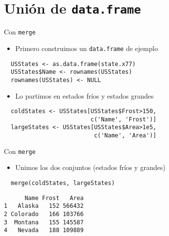 \documentclass[xcolor={usenames,svgnames,dvipsnames}]{beamer}
\begin{document}
\section{Unión de \texttt{data.frame}}
\label{sec-5}
\begin{frame}[fragile,label=sec-5-1]{Con \texttt{merge}}
 \begin{itemize}
\item Primero construimos un \texttt{data.frame} de ejemplo
\end{itemize}
\lstset{language=R,label= ,caption= ,numbers=none}
\begin{lstlisting}
  USStates <- as.data.frame(state.x77)
  USStates$Name <- rownames(USStates)
  rownames(USStates) <- NULL
\end{lstlisting}

\begin{itemize}
\item Lo partimos en estados \guillemotleft{}fríos\guillemotright{} y estados \guillemotleft{}grandes\guillemotright{}
\end{itemize}
\lstset{language=R,label= ,caption= ,numbers=none}
\begin{lstlisting}
  coldStates <- USStates[USStates$Frost>150,
                         c('Name', 'Frost')]
  largeStates <- USStates[USStates$Area>1e5,
                          c('Name', 'Area')]
\end{lstlisting}
\end{frame}

\begin{frame}[fragile,label=sec-5-2]{Con \texttt{merge}}
 \begin{itemize}
\item Unimos los dos conjuntos (estados \guillemotleft{}fríos\guillemotright{} y \guillemotleft{}grandes\guillemotright{})
\end{itemize}
\lstset{language=R,label= ,caption= ,numbers=none}
\begin{lstlisting}
  merge(coldStates, largeStates)
\end{lstlisting}

\begin{verbatim}
      Name Frost   Area
1   Alaska   152 566432
2 Colorado   166 103766
3  Montana   155 145587
4   Nevada   188 109889
\end{verbatim}
\end{frame}
\end{document}
